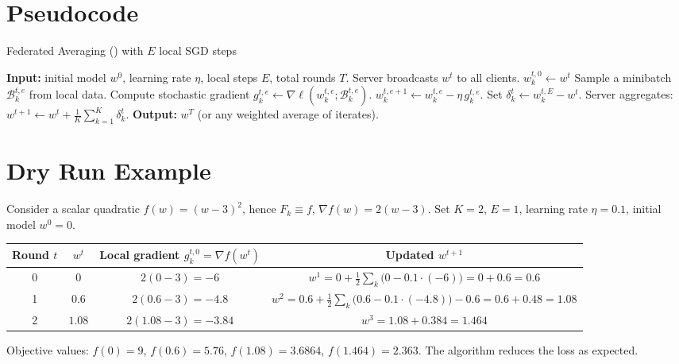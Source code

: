 \documentclass{article}
\newcommand{\fedavg}{\text{FedAvg}}
\begin{document}
\section*{Pseudocode}
\begin{algorithm}[H]
\caption{Federated Averaging (\fedavg) with $E$ local SGD steps}
\begin{algorithmic}[1]
\STATE \textbf{Input:} initial model $w^{0}$, learning rate $\eta$, local steps $E$, total rounds $T$.
    \STATE Server broadcasts $w^{t}$ to all clients.
        \STATE $w_{k}^{t,0}\gets w^{t}$
            \STATE Sample a minibatch $\mathcal{B}_{k}^{t,e}$ from local data.
            \STATE Compute stochastic gradient $g_{k}^{t,e}\gets \nabla\ell(w_{k}^{t,e};\mathcal{B}_{k}^{t,e})$.
            \STATE $w_{k}^{t,e+1}\gets w_{k}^{t,e}-\eta\,g_{k}^{t,e}$.
        \ENDFOR
        \STATE Set $\delta_k^{t}\gets w_{k}^{t,E}-w^{t}$.
    \ENDFOR
    \STATE Server aggregates: $w^{t+1}\gets w^{t}+ \frac{1}{K}\sum_{k=1}^{K}\delta_k^{t}$.
\ENDFOR
\STATE \textbf{Output:} $w^{T}$ (or any weighted average of iterates).
\end{algorithmic}
\end{algorithm}

\section*{Dry Run Example}
Consider a scalar quadratic $f(w)=(w-3)^{2}$, hence $F_k\equiv f$, $\nabla f(w)=2(w-3)$.  
Set $K=2$, $E=1$, learning rate $\eta=0.1$, initial model $w^{0}=0$.

\begin{center}
\begin{tabular}{c|c|c|c}
Round $t$ & $w^{t}$ & Local gradient $g_{k}^{t,0}= \nabla f(w^{t})$ & Updated $w^{t+1}$ \\ \hline
0 & $0$ & $2(0-3)=-6$ & $w^{1}=0+\frac{1}{2}\sum_{k}\big(0-0.1\cdot(-6)\big)=0+0.6=0.6$\\
1 & $0.6$ & $2(0.6-3)=-4.8$ & $w^{2}=0.6+\frac{1}{2}\sum_{k}\big(0.6-0.1\cdot(-4.8)\big)-0.6=0.6+0.48=1.08$\\
2 & $1.08$ & $2(1.08-3)=-3.84$ & $w^{3}=1.08+0.384=1.464$\\
\end{tabular}
\end{center}
Objective values: $f(0)=9$, $f(0.6)=5.76$, $f(1.08)=3.6864$, $f(1.464)=2.363$. The algorithm reduces the loss as expected.
\end{document}
